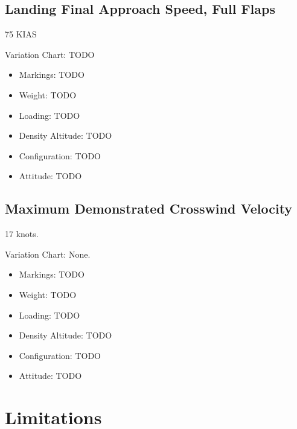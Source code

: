 \subsection{Landing Final Approach Speed, Full Flaps}

75 KIAS

Variation Chart: TODO
\begin{itemize}
\item Markings: TODO
\item Weight: TODO
\item Loading: TODO
\item Density Altitude: TODO
\item Configuration: TODO
\item Attitude: TODO
\end{itemize}

\subsection{Maximum Demonstrated Crosswind Velocity}

17 knots.

Variation Chart: None.

\begin{itemize}
\item Markings: TODO
\item Weight: TODO
\item Loading: TODO
\item Density Altitude: TODO
\item Configuration: TODO
\item Attitude: TODO
\end{itemize}

%
%

\section{Limitations}

